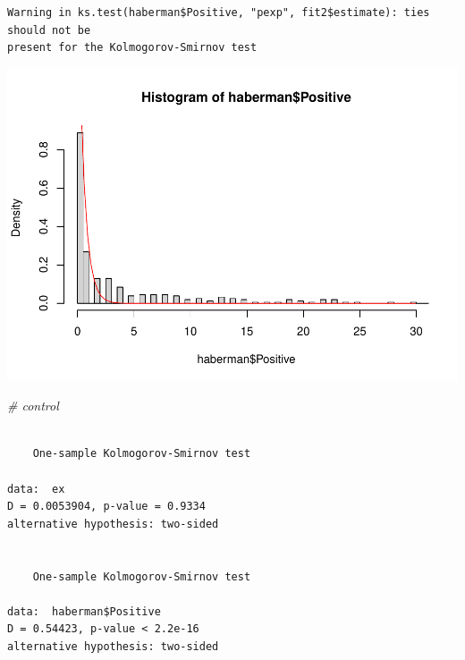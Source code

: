 \documentclass[
]{article}
\newenvironment{Shaded}{\begin{snugshade}}{\end{snugshade}}
\newcommand{\CommentTok}[1]{\textcolor[rgb]{0.56,0.35,0.01}{\textit{#1}}}
\newcommand{\DataTypeTok}[1]{\textcolor[rgb]{0.13,0.29,0.53}{#1}}
\newcommand{\DecValTok}[1]{\textcolor[rgb]{0.00,0.00,0.81}{#1}}
\newcommand{\FloatTok}[1]{\textcolor[rgb]{0.00,0.00,0.81}{#1}}
\newcommand{\KeywordTok}[1]{\textcolor[rgb]{0.13,0.29,0.53}{\textbf{#1}}}
\newcommand{\NormalTok}[1]{#1}
\newcommand{\OperatorTok}[1]{\textcolor[rgb]{0.81,0.36,0.00}{\textbf{#1}}}
\newcommand{\OtherTok}[1]{\textcolor[rgb]{0.56,0.35,0.01}{#1}}
\newcommand{\StringTok}[1]{\textcolor[rgb]{0.31,0.60,0.02}{#1}}
\begin{document}
\begin{verbatim}
Warning in ks.test(haberman$Positive, "pexp", fit2$estimate): ties should not be
present for the Kolmogorov-Smirnov test
\end{verbatim}

\begin{Shaded}
\end{Shaded}

\begin{center}\includegraphics{EDA2_files/figure-latex/unnamed-chunk-19-1} \end{center}

\begin{Shaded}
\begin{Highlighting}[]
\CommentTok{# control}
\end{Highlighting}
\end{Shaded}

\begin{verbatim}

    One-sample Kolmogorov-Smirnov test

data:  ex
D = 0.0053904, p-value = 0.9334
alternative hypothesis: two-sided


    One-sample Kolmogorov-Smirnov test

data:  haberman$Positive
D = 0.54423, p-value < 2.2e-16
alternative hypothesis: two-sided
\end{verbatim}
\end{document}
